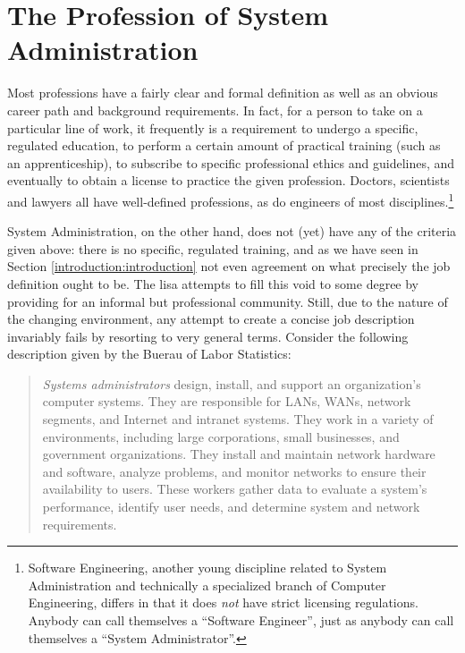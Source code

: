 \section{The Profession of System Administration}
\label{introduction:profession}

Most professions have a fairly clear and formal
definition as well as an obvious career path and
background requirements.  In fact, for a person to
take on a particular line of work, it frequently is
a requirement to undergo a specific, regulated
education, to perform a certain amount of practical
training (such as an apprenticeship), to subscribe to
specific professional ethics and
guidelines, and eventually to obtain a license to
practice the given profession.  Doctors, scientists
and lawyers all have well-defined professions, as do
engineers of most disciplines.\footnote{Software
Engineering, another young discipline related to
System Administration and technically a specialized
branch of Computer Engineering, differs in that it
does {\em not} have strict licensing regulations.
Anybody can call themselves a ``Software Engineer'',
just as anybody can call themselves a ``System
Administrator''.}

System Administration, on the other hand, does not
(yet) have any of the criteria given above: there is
no specific, regulated training, and as we have seen
in Section \ref{introduction:introduction} not even
agreement on what precisely the job definition ought
to be.  The \gls{lisa} attempts to fill
this void to some degree by providing for an informal
but professional community.  Still, due to the nature
of the changing environment, any attempt to create a
concise job description invariably fails by resorting
to very general terms.  Consider the following
description given by the Buerau of Labor
Statistics\cite{intro:bls}:

\begin{quote}
{\em Systems administrators} design, install, and
support an organization's computer systems. They are
responsible for LANs, WANs, network segments, and
Internet and intranet systems. They work in a variety
of environments, including large corporations, small
businesses, and government organizations. They install
and maintain network hardware and software, analyze
problems, and monitor networks to ensure their
availability to users. These workers gather data to
evaluate a system's performance, identify user needs,
and determine system and network requirements.
\end{quote}

